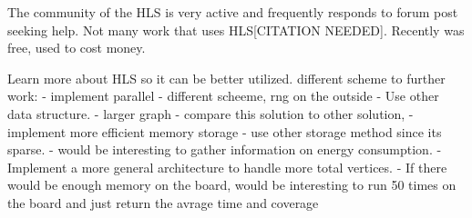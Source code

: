 The community of the HLS is very active and frequently responds to forum post seeking help.	Not many work that uses HLS[CITATION NEEDED]. Recently was free, used to cost money.


Learn more about HLS so it can be better utilized. 
different scheme to further work:
- implement parallel
- different scheeme, rng on the outside
- Use other data structure.
- larger graph
- compare this solution to other solution, 
- implement more efficient memory storage
- use other storage method since its sparse. 
- would be interesting to gather information on  energy consumption.
- Implement a more general architecture to handle more total vertices.
- If  there would be enough memory on the board, would be interesting to run 50 times on the board and just return the avrage time and coverage
